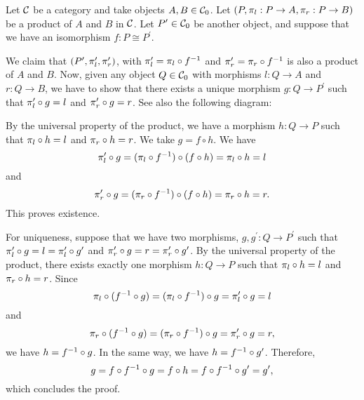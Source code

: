 \begin{solution}\label{sol:product_preserved_by_iso}
	Let $ \mathcal{C} $ be a category and take objects $ A, B \in {\mathcal{C}}_0 $. Let $ (P, \pi_l: P \to A, \pi_r: P \to B) $ be a product of $ A $ and $ B $ in $ \mathcal{C} $. Let $ P^\prime \in {\mathcal{C}}_0 $ be another object, and suppose that we have an isomorphism $ f: P \cong P^\prime $.

	We claim that $ (P^\prime, \pi_l^\prime, \pi_r^\prime) $, with $ \pi_l^\prime = \pi_l \circ f ^{-1} $ and $ \pi_r^\prime = \pi_r \circ f ^{-1} $ is also a product of $ A $ and $ B $. Now, given any object $ Q \in {\mathcal{C}}_0 $ with morphisms $ l: Q \to A $ and $ r: Q \to B $, we have to show that there exists a unique morphism $ g: Q \to P^\prime $ such that $ \pi_l^\prime \circ g = l $ and $ \pi_r^\prime \circ g = r $. See also the following diagram:

	\begin{center}
	\end{center}
	
	By the universal property of the product, we have a morphism $ h: Q \to P $ such that $ \pi_l \circ h = l $ and $ \pi_r \circ h = r $. We take $ g = f \circ h $. We have 
	\[ \pi_l^\prime \circ g = (\pi_l \circ f ^{-1}) \circ (f \circ h) = \pi_l \circ h = l  \]
	and
	\[ \pi_r^\prime \circ g = (\pi_r \circ f ^{-1}) \circ (f \circ h) = \pi_r \circ h = r.  \]
	This proves existence.

	For uniqueness, suppose that we have two morphisms, $ g, g^\prime: Q \to P^\prime $ such that $ \pi_l^\prime \circ g = l = \pi_l^\prime \circ g^\prime $ and $ \pi_r^\prime \circ g = r = \pi_r^\prime \circ g^\prime $. By the universal property of the product, there exists exactly one morphism $ h: Q \to P $ such that $ \pi_l \circ h = l $ and $ \pi_r \circ h = r $. Since
	\[ \pi_l \circ (f ^{-1} \circ g) = (\pi_l \circ f ^{-1}) \circ g = \pi_l^\prime \circ g = l \]
	and
	\[ \pi_r \circ (f ^{-1} \circ g) = (\pi_r \circ f ^{-1}) \circ g = \pi_r^\prime \circ g = r, \]
	we have $ h = f ^{-1} \circ g $. In the same way, we have $ h = f ^{-1} \circ g^\prime $. Therefore,
	\[ g = f \circ f ^{-1} \circ g = f \circ h = f \circ f ^{-1} \circ g^\prime = g^\prime, \]
	which concludes the proof.
\end{solution}

